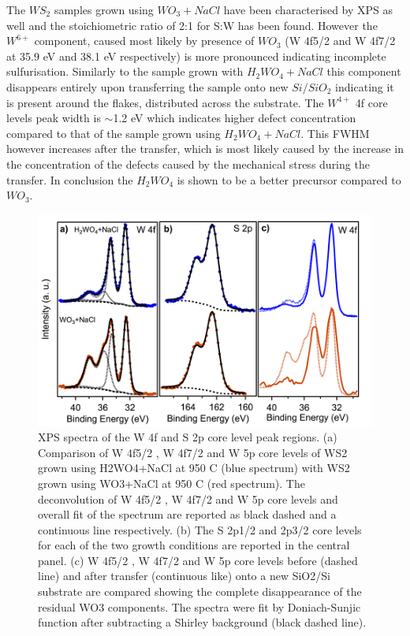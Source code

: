 \documentclass[12pt]{article}
\begin{document}
The $WS_2$ samples grown using $WO_3 + NaCl$ have been characterised by XPS as well and the stoichiometric ratio of 2:1 for S:W has been found. However the $W^{6+}$ component, caused most likely by presence of $WO_3$ (W 4f5/2 and W 4f7/2 at 35.9 eV and 38.1 eV respectively) is more pronounced indicating incomplete sulfurisation. Similarly to the sample grown with $H_2WO_4 + NaCl$ this component disappears entirely upon transferring the sample onto new $Si/SiO_2$ indicating it is present around the flakes, distributed across the substrate. The $W^{4+}$ 4f core levels peak width is {$\sim$}1.2 eV which indicates higher defect concentration compared to that of the sample grown using $H_2WO_4 + NaCl$. This FWHM however increases after the transfer, which is most likely caused by the increase in the concentration of the defects caused by the mechanical stress during the transfer. In conclusion the $H_2WO_4$ is shown to be a better precursor compared to $WO_3$.
 
\begin{figure}[h]
\begin{center}
\includegraphics[scale=0.3]{PaperXPS.png}
\caption{XPS spectra of the W 4f and S 2p core level peak regions. (a) Comparison  of W 4f5/2 , W 4f7/2  and W 5p core levels of WS2 grown using H2WO4+NaCl at 950 {\degree}C (blue spectrum) with WS2 grown using WO3+NaCl at 950 {\degree}C (red spectrum). The deconvolution of W 4f5/2 , W 4f7/2  and W 5p core levels and overall fit of the spectrum are reported as black dashed and a continuous line respectively. (b) The S 2p1/2 and 2p3/2 core levels for each of the two growth conditions are reported in the central panel. (c) W 4f5/2 , W 4f7/2  and W 5p core levels before (dashed line) and after transfer (continuous like) onto a new SiO2/Si substrate are compared showing the complete disappearance of the residual WO3 components. The spectra were fit by Doniach-Sunjic function after subtracting a Shirley background (black dashed line).}
\label{fig:PaperXPS}
\end{center}
\end{figure}
\end{document}
